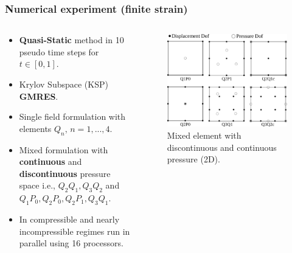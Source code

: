 \documentclass{beamer}
\begin{document}
\begin{frame}
	\frametitle{Numerical experiment (finite strain)}

	\begin{columns}
	\begin{column}{0.5\textwidth}
		\begin{itemize}
			\item \textbf{Quasi-Static} method in 10 pseudo time steps for $t \in [0, 1]$.
			\item Krylov Subspace (KSP) \textbf{GMRES}.
			\item Single field formulation with elements \alert{$Q_n, \, n=1,...,4$}.
			\item Mixed formulation with \textbf{continuous} and \textbf{discontinuous} pressure space i.e., \alert{$Q_2Q_1, Q_3Q_2$} and \alert{$Q_1P_0, Q_2P_0, Q_2P_1, Q_3Q_1$}.
			\item In compressible and nearly incompressible regimes run in parallel using 16 processors.
		\end{itemize}
	\end{column}
	\begin{column}{0.5\textwidth}
		\begin{figure}[h]
			\center\includegraphics[width=.9\textwidth]{../figs/mixed-element.png}
			\caption{Mixed element with discontinuous and continuous pressure (2D).}
		\end{figure}
	\end{column}
	\end{columns}
\end{frame}
\end{document}

